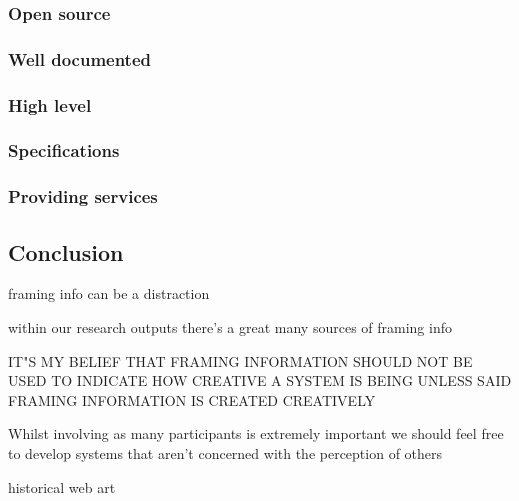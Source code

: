\documentclass[11pt]{article}
\begin{document}
\subsubsection{Open source}
\label{sec:org22d6eb1}
\subsubsection{Well documented}
\label{sec:orgc8b3dea}
\subsubsection{High level}
\label{sec:orge77887e}
\subsubsection{Specifications}
\label{sec:org194123c}
\subsubsection{Providing services}
\label{sec:org02fd3fc}

\subsection{Conclusion}
\label{sec:org797f983}
framing info can be a distraction

within our research outputs there's a great many sources of framing info

IT"S MY BELIEF THAT FRAMING INFORMATION SHOULD NOT BE USED TO INDICATE HOW CREATIVE A SYSTEM IS BEING UNLESS SAID FRAMING INFORMATION IS CREATED CREATIVELY

Whilst involving as many participants is extremely important we should feel free to develop systems that aren't concerned with the perception of others 

historical web art
\end{document}
